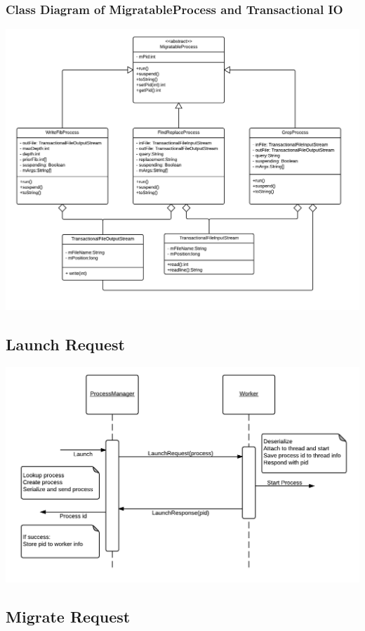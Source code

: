 \documentclass[12pt]{article}
\begin{document}
\subsubsection{Class Diagram of MigratableProcess and Transactional IO}
\includegraphics[scale=.3]{migratableProcess.png}

\subsection{Launch Request}

\includegraphics[scale=.4]{launch.png}

\subsection{Migrate Request}
\end{document}
